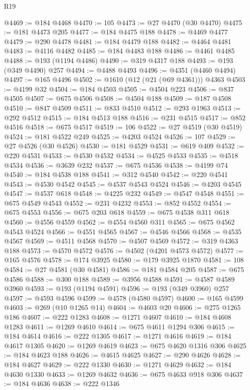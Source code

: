 \begin{lexlean}{R19}
\begin{coremodule}
@4469 := @184 @4468
@4470 := 105
@4473 := @27 @4470 (@30 @4470)
@4475 := @181 @4473 @205
@4477 := @184 @4475 @188
@4478 := @4469 @4477
@4479 := @290 @4478
@4481 := @184 @4479 @188
@4482 := @4464 @4481
@4483 := @4116 @4482
@4485 := @184 @4483 @188
@4486 := @4461 @4485
@4488 := @193 (@1194 @4486)
@4490 := @319 @4317 @188
@4493 := @193 (@349 @4490) @257
@4494 := @4488 @4493
@4496 := @4351 (@4460 @4494)
@4497 := @165 @4496
@4502 := @1610 (@12 (@21 (@69 @4361))) @4363
@4503 := @4199 @32
@4504 := @184 @4503
@4505 := @4504 @223
@4506 := @837 @4505
@4507 := @675 @4506
@4508 := @4504 @188
@4509 := @187 @4508
@4510 := @847 @4509
@4511 := @833 @4510
@4512 := @293 @1963
@4513 := @292 @4512
@4515 := @184 @4513 @188
@4516 := @231 @4515
@4517 := @852 @4516
@4518 := @675 @4517
@4519 := 106
@4522 := @27 @4519 (@30 @4519)
@4524 := @181 @4522 @249
@4525 := @4203 @4524
@4526 := 107
@4529 := @27 @4526 (@30 @4526)
@4530 := @181 @4529
@4531 := @619 @409
@4532 := @220 @4531
@4533 := @4530 @4532
@4534 := @4525 @4533
@4535 := @4518 @4534
@4536 := @3639 @232
@4537 := @675 @4536
@4538 := @4199 @74
@4540 := @184 @4538 @188
@4541 := @312 @4540
@4542 := @220 @4541
@4543 := @4530 @4542
@4545 := @4537 @4543 @4524
@4546 := @4203 @4545
@4547 := @4537 @618
@4548 := @4225 @232
@4549 := @4547 @4548
@4551 := @675 @4549 @4543
@4552 := @231 @4232
@4553 := @852 @4552
@4554 := @675 @4553
@4556 := @675 @203 @618
@4559 := @675 @4538 @311 @618
@4560 := @4556 @4559
@4562 := @4554 @4560 @311
@4565 := @675 @4562 @4543 @4524
@4566 := @4551 @4565
@4567 := @4546 @4566
@4568 := @4535 @4567
@4569 := @4511 @4568
@4570 := @4507 @4569
@4572 := @319 @4363 @188
@4573 := @4570 @4572
@4576 := @4502 (@4201 @4573 @4572)
@4577 := @165 @4576
@4578 := @174 @3925
@4580 := @179 @3925 @1870
@4581 := 108
@4584 := @27 @4581 (@30 @4581)
@4586 := @181 @4584 @205
@4587 := @675 @4586
@4588 := @300 @188
@4589 := @3956 @4588
@4591 := @4587 @4589 @3960
@4593 := @193 (@1194 @4591)
@4596 := @193 (@349 @3960) @257
@4597 := @4593 @4596
@4599 := @4578 (@4580 @4597)
@4600 := @165 @4599
@4603 := @269 (@10 @1265 @14)
@4604 := @4603 @20
@4606 := @275 @1265 @186
@4607 := @222 @1283
@4608 := @1271 @4607
@4610 := @184 @4608 @1283
@4611 := @1269 @4610
@4614 := @675 @4611 @1294 @306
@4615 := @184 @4614
@4616 := @222 @1305
@4617 := @1271 @4616
@4619 := @184 @4617 @1305
@4620 := @1269 @4619
@4623 := @675 @4620 @1316 @306
@4625 := @184 @4623 @188
@4626 := @4615 @4625
@4627 := @290 @4626
@4628 := @184 @4627
@4629 := @222 @1330
@4630 := @1271 @4629
@4632 := @184 @4630 @1330
@4633 := @1269 @4632
@4636 := @675 @4633 @918 @306
@4637 := @184 @4636
@4638 := @222 @1346

\end{coremodule}
\end{lexlean}
